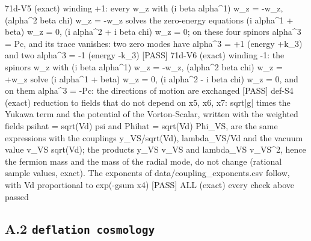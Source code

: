 \documentclass[
  10pt,
]{article}
\newenvironment{Shaded}{}{}
\newcommand{\NormalTok}[1]{#1}
\begin{document}
\begin{Shaded}
\begin{Highlighting}[]
\NormalTok{[PASS] 71d{-}V5  (exact) winding +1: every w\_z with (i beta alpha\^{}1) w\_z = {-}w\_z, (alpha\^{}2 beta chi) w\_z = {-}w\_z solves the zero{-}energy equations (i alpha\^{}1 + beta) w\_z = 0, (i alpha\^{}2 + i beta chi) w\_z = 0; on these four spinors alpha\^{}3 = Pc, and its trace vanishes: two zero modes have alpha\^{}3 = +1 (energy +k\_3) and two alpha\^{}3 = {-}1 (energy {-}k\_3)}
\NormalTok{[PASS] 71d{-}V6  (exact) winding {-}1: the spinors w\_z with (i beta alpha\^{}1) w\_z = {-}w\_z, (alpha\^{}2 beta chi) w\_z = +w\_z solve (i alpha\^{}1 + beta) w\_z = 0, (i alpha\^{}2 {-} i beta chi) w\_z = 0, and on them alpha\^{}3 = {-}Pc: the directions of motion are exchanged}
\NormalTok{[PASS] def{-}S4  (exact) reduction to fields that do not depend on x5, x6, x7: sqrt|g| times the Yukawa term and the potential of the Vorton{-}Scalar, written with the weighted fields psihat = sqrt(Vd) psi and Phihat = sqrt(Vd) Phi\_VS, are the same expressions with the couplings y\_VS/sqrt(Vd), lambda\_VS/Vd and the vacuum value v\_VS sqrt(Vd); the products y\_VS v\_VS and lambda\_VS v\_VS\^{}2, hence the fermion mass and the mass of the radial mode, do not change (rational sample values, exact). The exponents of data/coupling\_exponents.csv follow, with Vd proportional to exp({-}gsum x4)}
\NormalTok{[PASS] ALL  (exact) every check above passed}
\end{Highlighting}
\end{Shaded}

\hypertarget{a.2-deflation-cosmology}{%
\subsection{\texorpdfstring{A.2
\texttt{deflation\ cosmology}}{A.2 deflation cosmology}}\label{a.2-deflation-cosmology}}
\end{document}
